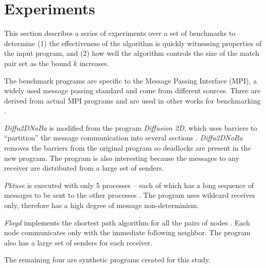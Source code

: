 \section{Experiments}
This section describes a series of experiments over a set of benchmarks to determine (1) the effectiveness of the algorithm is quickly witnessing properties of the input program, and (2) how well the algorithm controls the size of the match pair set as the bound $k$ increases.

The benchmark programs are specific to the Message Passing Interface (MPI), a widely used message passing standard \cite{mpi3.1} and come from different sources. Three are derived from actual MPI programs and are used in other works for benchmarking \cite{benchmark:fevs,mpptest_benchmark,DBLP:conf/ppopp/XueLWGCZZV09}.

\begin{compactitem}
\item \textit{Diffu2DNoBa} is modified from the program \textit{Diffusion 2D}, which uses barriers to “partition” the message communication into several sections \cite{benchmark:fevs}. \textit{Diffu2DNoBa} removes the barriers from the original program so deadlocks are present in the new program. The program is also interesting because the messages to any receiver are distributed from a large set of senders.

\item \textit{Pktuse} is executed with only 5 processes -- each of which has a long sequence of messages to be sent to the other processes \cite{mpptest_benchmark}. The program uses wildcard receives only, therefore has a high degree of message non-determinism. 

\item \textit{Floyd} implements the shortest path algorithm for all the pairs of nodes \cite{DBLP:conf/ppopp/XueLWGCZZV09}. Each node communicates only with the immediate following neighbor. The program also has a large set of senders for each receiver. 
\end{compactitem}

The remaining four are synthetic programs created for this study.

